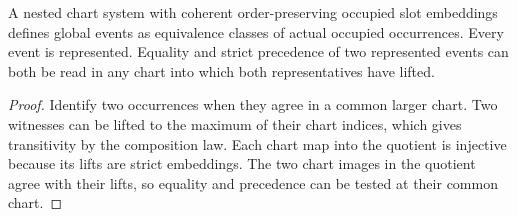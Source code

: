 \begin{theorem}
\label{hir:g8-cofinal-event-limit}
\leanok
A nested chart system with coherent order-preserving occupied slot
embeddings defines global events as equivalence classes of actual
occupied occurrences. Every event is represented. Equality and
strict precedence of two represented events can both be read in
any chart into which both representatives have lifted.
\end{theorem}
\begin{proof}
Identify two occurrences when they agree in a common larger chart.
Two witnesses can be lifted to the maximum of their chart indices,
which gives transitivity by the composition law. Each chart map
into the quotient is injective because its lifts are strict
embeddings. The two chart images in the quotient agree with their
lifts, so equality and precedence can be tested at their common chart.
\end{proof}

